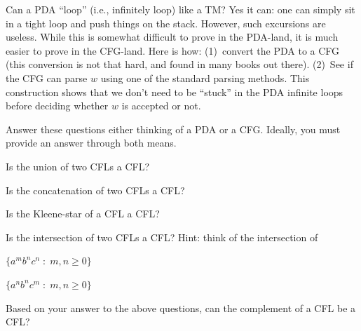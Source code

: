 \documentclass[12pt]{article}
\begin{document}
\begin{large}
\begin{enumerate}
\item Can a PDA ``loop'' (i.e., infinitely loop) like a TM?
  Yes it can: one can simply sit in a tight loop and push
  things on the stack.
  However, such excursions are useless. While this is
    somewhat difficult to prove in the PDA-land, it is much easier
    to prove in the CFG-land. Here is how: (1)~convert the PDA
    to a CFG (this conversion is not that hard, and found in
    many books out there). (2)~See if the CFG can parse $w$ using
    one of the standard parsing methods. This construction shows
    that we don't need to be ``stuck'' in the PDA infinite loops
    before deciding whether $w$ is accepted or not.

  \item Answer these questions either thinking of a PDA or a CFG.
    Ideally, you must provide an answer through both means.
  \begin{compactenum}
  \item Is the union of two CFLs a CFL?
  \item Is the concatenation of two CFLs a CFL?
  \item Is the Kleene-star of a CFL a CFL?
  \item Is the intersection of two CFLs a CFL?
    Hint: think of the intersection of
    \begin{compactenum}
    \item \( \{a^m b^n c^n \;:\; m,n \ge 0 \} \)
    \item \( \{a^n b^n c^m \;:\; m,n \ge 0 \} \)
    \end{compactenum}
  \item Based on your answer to the above questions,
    can the complement of a CFL be a CFL?
  \end{compactenum}
  

\end{enumerate}
\end{large}
\end{document}

